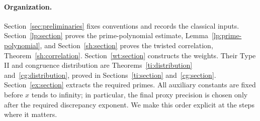 \documentclass[11pt]{article}
\newcommand{\1}{\mathbf{1}}
\theoremstyle{definition}
\theoremstyle{remark}
\numberwithin{equation}{section}
\begin{document}
\paragraph{Organization.}
Section~\ref{sec:preliminaries} fixes conventions and records the
classical inputs. Section~\ref{lp:section} proves the prime-polynomial
estimate, Lemma~\ref{lp:prime-polynomial}, and
Section~\ref{sh:section} proves the twisted correlation,
Theorem~\ref{sh:correlation}. Section~\ref{wt:section} constructs the
weights. Their Type II and congruence distribution are
Theorems~\ref{ti:distribution} and~\ref{cg:distribution}, proved in
Sections~\ref{ti:section} and~\ref{cg:section}.
Section~\ref{ex:section} extracts the required primes.
All auxiliary constants are fixed before $x$ tends to
infinity; in particular, the final proxy precision is chosen only
after the required discrepancy exponent. We make this order explicit
at the steps where it matters.









\end{document}
